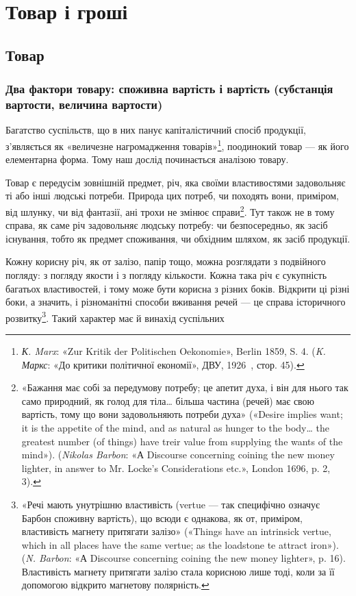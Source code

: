 \chapter{Товар і гроші}
\section{Товар}
\subsection{Два фактори товару: споживна вартість і вартість (субстанція
вартости, величина вартости)}

Багатство суспільств, що в них панує капіталістичний спосіб
продукції, з’являється як «величезне нагромадження товарів»\footnote{
\emph{К. Marx}: «Zur Kritik der Politischen Oekonomie», Berlin 1859,
S. 4. (\emph{K. Маркс}: «До критики політичної економії», ДВУ, 1926~,
стор. 45).
},
поодинокий товар — як його елементарна форма. Тому наш
дослід починається аналізою товару.

Товар є передусім зовнішній предмет, річ, яка своїми властивостями
задовольняє ті або інші людські потреби. Природа цих
потреб, чи походять вони, приміром, від шлунку, чи від фантазії,
ані трохи не змінює справи\footnote{
«Бажання має собі за передумову потребу; це апетит духа, і він
для нього так само природний, як голод для тіла\dots{} більша частина (речей)
має свою вартість, тому що вони задовольняють потреби духа» («Desire
implies want; it is the appetite of the mind, and as natural as hunger to
the body\dots{} the greatest number (of things) have treir value from supplying
the wants of the mind»). (\emph{Nikolas Barbon}: «А Discourse concerning coining
the new money lighter, in answer to Mr. Locke’s Considerations
etc.», London 1696, p. 2, 3).
}. Тут також не в тому справа, як саме
річ задовольняє людську потребу: чи безпосередньо, як засіб
існування, тобто як предмет споживання, чи обхідним шляхом,
як засіб продукції.

Кожну корисну річ, як от залізо, папір тощо, можна розглядати
з подвійного погляду: з погляду якости і з погляду кількости.
Кожна така річ є сукупність багатьох властивостей, і тому
може бути корисна з різних боків. Відкрити ці різні боки, а значить,
і різноманітні способи вживання речей — це справа історичного
розвитку\footnote{
«Речі мають унутрішню властивість (vertue — так специфічно
означує Барбон споживну вартість), що всюди є однакова, як от, приміром,
властивість магнету притягати залізо» («Things have an intrinsick vertue,
which in all places have the same vertue; as the loadstone te attract iron»).
(\emph{N. Barbon}: «А Discourse concerning coining the new money lighter»,
p. 16). Властивість магнету притягати залізо стала корисною лише тоді,
коли за її допомогою відкрито магнетову полярність.
}. Такий характер має й винахід суспільних
\parbreak{}  %
